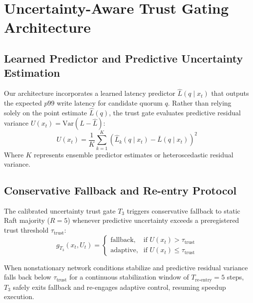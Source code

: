 \section{Uncertainty-Aware Trust Gating Architecture}
\label{sec:gating}

\subsection{Learned Predictor and Predictive Uncertainty Estimation}
Our architecture incorporates a learned latency predictor $\hat{L}(q \mid x_t)$ that outputs the expected $p99$ write latency for candidate quorum $q$. Rather than relying solely on the point estimate $\hat{L}(q)$, the trust gate evaluates predictive residual variance $U(x_t) = \text{Var}(L - \hat{L})$:
\begin{equation}
U(x_t) = \frac{1}{K} \sum_{k=1}^K \left( \hat{L}_k(q \mid x_t) - \bar{L}(q \mid x_t) \right)^2
\end{equation}
Where $K$ represents ensemble predictor estimates or heteroscedastic residual variance.

\subsection{Conservative Fallback and Re-entry Protocol}
The calibrated uncertainty trust gate $T_3$ triggers conservative fallback to static Raft majority ($R=5$) whenever predictive uncertainty exceeds a preregistered trust threshold $\tau_{\text{trust}}$:
\begin{equation}
g_{T_3}(x_t, U_t) = 
\begin{cases} 
\text{fallback}, & \text{if } U(x_t) > \tau_{\text{trust}} \\
\text{adaptive}, & \text{if } U(x_t) \le \tau_{\text{trust}}
\end{cases}
\end{equation}

When nonstationary network conditions stabilize and predictive residual variance falls back below $\tau_{\text{trust}}$ for a continuous stabilization window of $T_{\text{re-entry}} = 5$ steps, $T_3$ safely exits fallback and re-engages adaptive control, resuming speedup execution.
